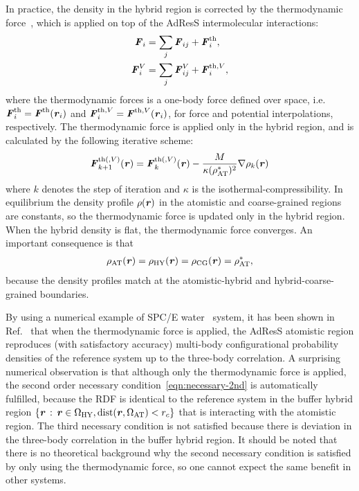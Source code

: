 \documentclass[epjST]{svjour}
\newcommand{\vect}[1]{\textbf{\textit{#1}}}
\newcommand{\dist}[0]{\textrm {dist}}
\newcommand{\AT}[0]{\textrm{AT}}
\newcommand{\HY}[0]{\textrm{HY}}
\newcommand{\CG}[0]{\textrm{CG}}
\newcommand{\moleidxone}[0]{i}
\newcommand{\moleidxtwo}[0]{j}
\newcommand{\thf}{{\textrm{th}}}
\begin{document}
In practice, the density in the hybrid region is corrected by the
thermodynamic force~\cite{fritsch2012adaptive}, which is applied on top of the AdResS intermolecular interactions:
\begin{align}\label{eqn:thf-f}
  \vect F_\moleidxone &= \sum_\moleidxtwo \vect F_{\moleidxone\moleidxtwo}  + \vect F_\moleidxone^\thf,  \\\label{eqn:thf-p}
  \vect F^V_\moleidxone& = \sum_\moleidxtwo \vect F^V_{\moleidxone\moleidxtwo} + \vect F_\moleidxone^{\thf,V},
\end{align}
where the thermodynamic forces is a one-body force defined over space,
i.e.~$\vect F^\thf_i = \vect F^\thf(\vect r_\moleidxone)$ and $\vect F^{\thf, V}_\moleidxone = \vect F^{\thf,V}(\vect r_\moleidxone)$,
for force and potential interpolations, respectively.
The thermodynamic force is applied only in the hybrid region, and is
calculated by the following iterative scheme:
\begin{align}\label{eqn:tfi}
  \vect F_{k+1}^{\thf(, V)} (\vect r) = \vect F_k^{\thf(, V)} (\vect r)-
  \frac{M}{\kappa(\rho^\ast_\AT)^2} \nabla\rho_k(\vect r)
\end{align}
where $k$ denotes the step of iteration and $\kappa$ is the
isothermal-compressibility. In equilibrium the density profile $\rho(\vect r)$ in the
atomistic and coarse-grained regions are constants, so the thermodynamic force
is updated only in the hybrid region. When the hybrid density is flat, the thermodynamic
force converges. An important consequence is that
\begin{align}
  \rho_\AT(\vect r) = \rho_\HY(\vect r) = \rho_\CG(\vect r) = \rho_\AT^\ast,
\end{align}
because the density profiles match at the atomistic-hybrid and
hybrid-coarse-grained boundaries.

By using a numerical example of SPC/E water~\cite{berendsen1987missing}
system, it has been shown in Ref.~\cite{wang2013grand} that when the
thermodynamic force is applied, the AdResS atomistic region reproduces (with satisfactory accuracy)
multi-body configurational probability densities of the reference system
up to the three-body correlation.
A surprising numerical observation is that although
only the thermodynamic force is applied, the second order necessary condition~\eqref{eqn:necessary-2nd}
is automatically fulfilled, because the RDF is identical to the reference system in the buffer hybrid region
$\{\vect r \,:\, \vect r \in\Omega_\HY, \dist(\vect r, \Omega_\AT) < r_c\}$ that is interacting with
the atomistic region. The third necessary condition is not satisfied because there is deviation
in the three-body correlation in the buffer hybrid region.
It should be noted that there is no theoretical background why the second necessary
condition is satisfied by only using the thermodynamic force,
so one cannot expect the same benefit in other systems.
\end{document}

